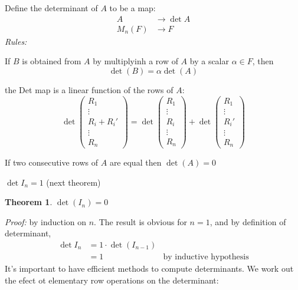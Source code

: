 \documentclass{report}
\makeatletter
\newtheorem{theorem}{Theorem}[subsection]
\theoremstyle{remark}
\theoremstyle{definition}
\theoremstyle{definition}
\theoremstyle{theorem}
\providecommand{\varitem}{} %
\newenvironment{axioms}[1]
 {\renewcommand\varitem[1]{\item[\textbf{#1\arabic{enumi}\rlap{$##1$}.}]%
    \edef\@currentlabel{#1\arabic{enumi}{$##1$}}}%
  \enumerate[label=\textbf{#1\arabic*.}, ref=#1\arabic*]}
 {\endenumerate}
\makeatother
\begin{document}
Define the determinant of $A$ to be a map:
\begin{align*}
    A &\rightarrow \det A\\
    M_n(F) &\rightarrow F
\end{align*}
\emph{Rules:}
\begin{axioms}{D}
    \item If $B$ is obtained from $A$ by multiplyinh a row of $A$ by a scalar $\alpha \in F$, then
    \[\det(B)=\alpha\det(A)\]
    \item the Det map is a linear function of the rows of $A$:
    \[\det\begin{pmatrix}
    R_1\\
    \vdots\\
    R_i + R_i'\\
    \vdots\\
    R_n
    \end{pmatrix} = \det\begin{pmatrix}
    R_1\\
    \vdots\\
    R_i\\
    \vdots\\
    R_n
    \end{pmatrix} + \det\begin{pmatrix}
    R_1\\
    \vdots\\
    R_i'\\
    \vdots\\
    R_n
    \end{pmatrix} \]
    \item If two consecutive rows of $A$ are equal then $\det(A)=0$
    \item $\det I_n = 1$ (next theorem)
\end{axioms}
\begin{theorem}
$\det(I_n)=0$
\end{theorem}
\emph{Proof:} by induction on $n$. The result is obvious for $n=1$, and by definition of determinant,
\begin{align*}
    \det I_n &= 1 \cdot \det(I_{n-1})\\
    &= 1 & \text{by inductive hypothesis}
\end{align*}
It's important to have efficient methods to compute determinants. We work out the efect ot elementary row operations on the determinant:
\end{document}
